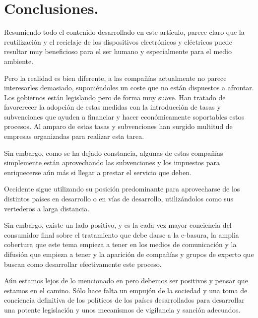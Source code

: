 \section{Conclusiones.}

Resumiendo todo el contenido desarrollado en este artículo, parece claro que la reutilización y el reciclaje de los dispositivos electrónicos y eléctricos puede resultar muy beneficioso para el ser humano y especialmente para el medio ambiente.

Pero la realidad es bien diferente, a las compañías actualmente no parece interesarles demasiado, suponiéndoles un coste que no están dispuestos a afrontar. Los gobiernos están legislando pero de forma muy suave. Han tratado de favorerecer la adopción de estas medidas con la introducción de tasas y subvenciones que ayuden a financiar y hacer económicamente soportables estos procesos. Al amparo de estas tasas y subvenciones han surgido multitud de empresas organizadas para realizar esta tarea.

Sin embargo, como se ha dejado constancia, algunas de estas compañías simplemente están aprovechando las subvenciones y los impuestos para enriquecerse aún más si llegar a prestar el servicio que deben. 

Occidente sigue utilizando su posición predominante para aprovecharse de los distintos países en desarrollo o en vías de desarrollo, utilizándolos como sus vertederos a larga distancia.

Sin embargo, existe un lado positivo, y es la cada vez mayor conciencia del consumidor final sobre el tratamiento que debe darse a la e-basura, la amplia cobertura que este tema empieza a tener en los medios de comunicación y la difusión que empieza a tener y la aparición de compañías y grupos de experto que buscan como desarrollar efectivamente este proceso.

Aún estamos lejos de lo mencionado en \cite{reusing-silicon} pero debemos ser positivos y pensar que estamos en el camino. Sólo hace falta un empujón de la sociedad y una toma de conciencia definitiva de los políticos de los países desarrollados para desarrollar una potente legislación y unos mecanismos de vigilancia y sanción adecuados.